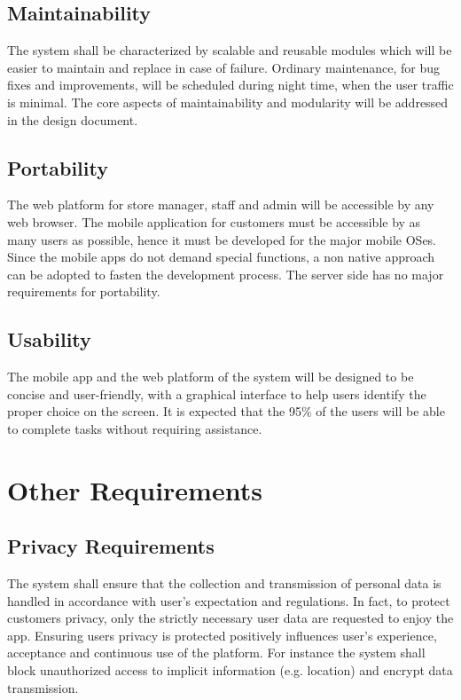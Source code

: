 \subsection{Maintainability}
The system shall be characterized by scalable and reusable modules which will be easier to maintain and replace in case of failure. Ordinary maintenance, for bug fixes and improvements, will be scheduled during night time, when the user traffic is minimal.\newline
The core aspects of maintainability and modularity will be addressed in the design document.

\subsection{Portability}
The web platform for store manager, staff and admin will be accessible by any web browser.\newline
The mobile application for customers must be accessible by as many users as possible, hence it must be developed for the major mobile OSes. Since the mobile apps do not demand special functions, a non native approach can be adopted to fasten the development process.
The server side has no major requirements for portability.

\subsection{Usability}
The mobile app and the web platform of the system will be designed to be concise and user-friendly, with a graphical interface to help users identify the proper choice on the screen. It is expected that the 95\% of the users will be able to complete tasks without requiring assistance.

\section{Other Requirements}

\subsection{Privacy Requirements}\label{req:privacy}
The system shall ensure that the collection and transmission of personal data is handled in accordance with user’s expectation and regulations.\newline
In fact, to protect customers privacy, only the strictly necessary user data are requested to enjoy the app. Ensuring users privacy is protected positively influences user’s experience, acceptance and continuous use of the platform. For instance the system shall block unauthorized access to implicit information (e.g. location) and encrypt data transmission.

